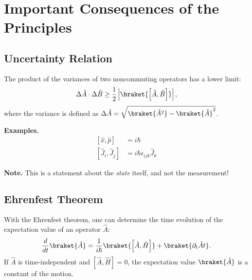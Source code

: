 \section{Important Consequences of the Principles}
\subsection{Uncertainty Relation}

The product of the variances of two noncommuting operators has a lower limit:
\begin{align}
    \Delta \hat{A} \cdot \Delta \hat{B} \geq \frac{1}{2} \left| \braket{\left[\hat{A},\hat{B}\right]} \right|,
\end{align}
where the variance is defined as $\Delta \hat{A} = \sqrt{\braket{\hat{A}^2}-\braket{\hat{A}}^2}$.

\textbf{Examples.}
\begin{align}
	\left[ \hat{x}, \hat{p} \right] &= i \hbar \\
\left[ \hat{J}_i , \hat{J}_j \right] &= i \hbar \epsilon_{ijk} \hat{J}_k
\end{align}
				
\textbf{Note.} This is a statement about the \emph{state} itself, and not the measurement!

\subsection{Ehrenfest Theorem}
With the Ehrenfest theorem, one can determine the time evolution of the expectation value of an operator $\hat{A}$:
\begin{align}
 \frac{d}{dt}\braket{\hat{A}}=\frac{1}{i\hbar}\braket{\left[\hat{A},\hat{H}\right]}+\braket{\partial_t{\hat{A}}{t}}. \label{eq:ehrenfest}
\end{align}
If $\hat{A}$ is time-independent and $\left[\hat{A},\hat{H}\right]=0$, the expectation value $\braket{\hat{A}}$ is a constant of the motion.